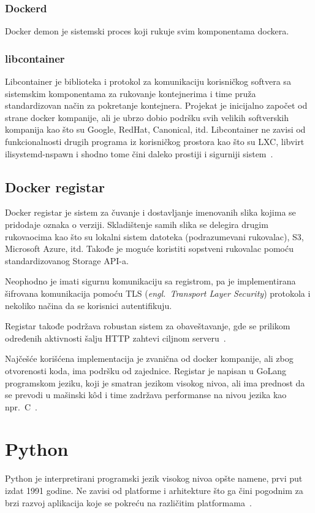 \documentclass[12pt]{report}
\begin{document}
\subsubsection{Dockerd}
Docker demon je sistemski proces koji rukuje svim komponentama dockera.

\subsubsection{libcontainer}
Libcontainer je biblioteka i protokol za komunikaciju korisničkog softvera sa sistemskim komponentama za rukovanje kontejnerima i time pruža standardizovan način za pokretanje kontejnera. Projekat je inicijalno započet od strane docker kompanije, ali je ubrzo dobio podršku svih velikih softverskih kompanija kao što su Google, RedHat, Canonical, itd. Libcontainer ne zavisi od funkcionalnosti drugih programa iz korisničkog prostora kao što su LXC, libvirt ilisystemd-nspawn i shodno tome čini daleko prostiji i sigurniji sistem~\cite{zdnet-libcontainer}.

\subsection{Docker registar}\label{section-register}
Docker registar je sistem za čuvanje i dostavljanje imenovanih slika kojima se pridodaje oznaka o verziji. Skladištenje samih slika se delegira drugim rukovaocima kao što su lokalni sistem datoteka (podrazumevani rukovalac), S3, Microsoft Azure, itd. Takođe je moguće koristiti sopstveni rukovalac pomoću standardizovanog Storage API-a.

Neophodno je imati sigurnu komunikaciju sa registrom, pa je implementirana šifrovana komunikacija pomoću \acrshort{TLS} (\textit{engl.\ Transport Layer Security}) protokola i nekoliko načina da se korisnici autentifikuju.

Registar takođe podržava robustan sistem za obaveštavanje, gde se prilikom određenih aktivnosti šalju \acrshort{HTTP} zahtevi ciljnom serveru~\cite{docker-registry}.

Najčešće korišćena implementacija je zvanična od docker kompanije, ali zbog otvorenosti koda, ima podršku od zajednice. Registar je napisan u GoLang programskom jeziku, koji je smatran jezikom visokog nivoa, ali ima prednost da se prevodi u mašinski kôd i time zadržava performanse na nivou jezika kao npr.\ C~\cite{docker-registry-github}.

\section{Python}
Python je interpretirani programski jezik visokog nivoa opšte namene, prvi put izdat 1991 godine. Ne zavisi od platforme i arhitekture što ga čini pogodnim za brzi razvoj aplikacija koje se pokreću na različitim platformama~\cite{python}.
\end{document}
